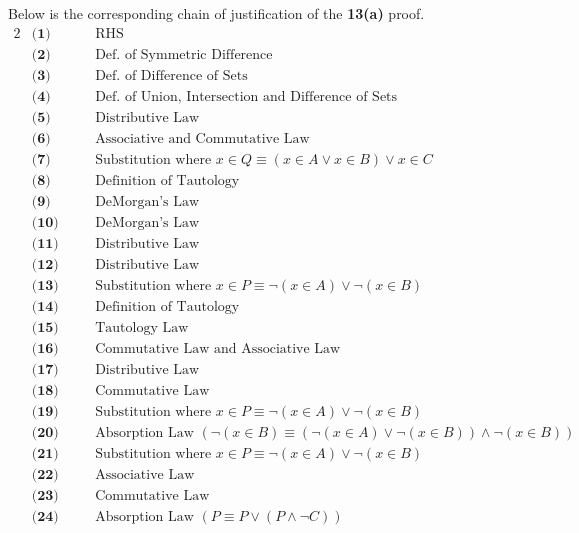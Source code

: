 Below is the corresponding chain of justification of the \textbf{13(a)} proof.
\begin{alignat*}{2}
&\textbf{(1)} && \quad \text{RHS}\\
&\textbf{(2)} && \quad \text{Def. of Symmetric Difference}\\
&\textbf{(3)} && \quad \text{Def. of Difference of Sets}\\
&\textbf{(4)} && \quad \text{Def. of Union, Intersection and Difference of Sets}\\
&\textbf{(5)} && \quad \text{Distributive Law}\\
&\textbf{(6)} && \quad \text{Associative and Commutative Law}\\
&\textbf{(7)} && \quad \text{Substitution where $x \in Q \equiv (x \in A \vee x \in B) \vee x \in C$}\\
&\textbf{(8)} && \quad \text{Definition of Tautology}\\
&\textbf{(9)} && \quad \text{DeMorgan's Law}\\
&\textbf{(10)} && \quad \text{DeMorgan's Law}\\
&\textbf{(11)} && \quad \text{Distributive Law}\\
&\textbf{(12)} && \quad \text{Distributive Law}\\
&\textbf{(13)} && \quad \text{Substitution where $x \in P \equiv \neg (x \in A) \vee \neg (x \in B)$}\\
&\textbf{(14)} && \quad \text{Definition of Tautology}\\
&\textbf{(15)} && \quad \text{Tautology Law}\\
&\textbf{(16)} && \quad \text{Commutative Law and Associative Law}\\
&\textbf{(17)} && \quad \text{Distributive Law}\\
&\textbf{(18)} && \quad \text{Commutative Law}\\
&\textbf{(19)} && \quad \text{Substitution where $x \in P \equiv \neg (x \in A) \vee \neg (x \in B)$}\\
&\textbf{(20)} && \quad \text{Absorption Law $(\neg (x \in B) \equiv (\neg (x \in A) \vee \neg (x \in B)) \wedge \neg (x \in B))$}\\
&\textbf{(21)} && \quad \text{Substitution where $x \in P \equiv \neg (x \in A) \vee \neg (x \in B)$}\\
&\textbf{(22)} && \quad \text{Associative Law}\\
&\textbf{(23)} && \quad \text{Commutative Law}\\
&\textbf{(24)} && \quad \text{Absorption Law $(P \equiv P \vee (P \wedge \neg C))$}\\

\end{alignat*}
